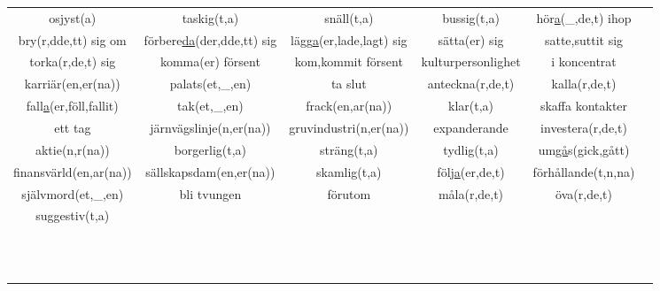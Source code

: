 \begin{center}
\begin{adjustwidth}{-2.5cm}{}
\begin{tabular}{|c c c c c c|}
            osjyst(a) & taskig(t,a) & snäll(t,a) & bussig(t,a) & hör\underline{a}(\_,de,t) ihop &  \\
            bry(r,dde,tt) sig om & förbere\underline{da}(der,dde,tt) sig & lägg\underline{a}(er,lade,lagt) sig & sätta(er) sig & satte,suttit sig &  \\
            torka(r,de,t) sig & komma(er) försent & kom,kommit försent & kulturpersonlighet & i koncentrat &  \\
            karriär(en,er(na)) & palats(et,\_,en) & ta slut & anteckna(r,de,t) & kalla(r,de,t) &  \\
            fall\underline{a}(er,föll,fallit) & tak(et,\_,en) & frack(en,ar(na)) & klar(t,a) & skaffa kontakter &  \\
            ett tag & järnvägslinje(n,er(na)) & gruvindustri(n,er(na)) & expanderande & investera(r,de,t) &  \\
            aktie(n,r(na)) & borgerlig(t,a) & sträng(t,a) & tydlig(t,a) & um\underline{gå}s(gick,gått) &  \\
            finansvärld(en,ar(na)) & sällskapsdam(en,er(na)) & skamlig(t,a) & följ\underline{a}(er,de,t) & förhållande(t,n,na) &  \\
            självmord(et,\_,en) & bli tvungen & förutom & måla(r,de,t) & öva(r,de,t) &  \\
            suggestiv(t,a) &  &  &  &  &  \\
             &  &  &  &  &  \\
             &  &  &  &  &  \\
             &  &  &  &  &  \\
             &  &  &  &  &  \\
             &  &  &  &  &  \\
             &  &  &  &  &  \\
             &  &  &  &  &  \\
             &  &  &  &  &  \\
             &  &  &  &  &  \\
             &  &  &  &  &  \\
             &  &  &  &  &  \\
             &  &  &  &  &  \\
            \hline
        \end{tabular}
    \end{adjustwidth}
\end{center}

